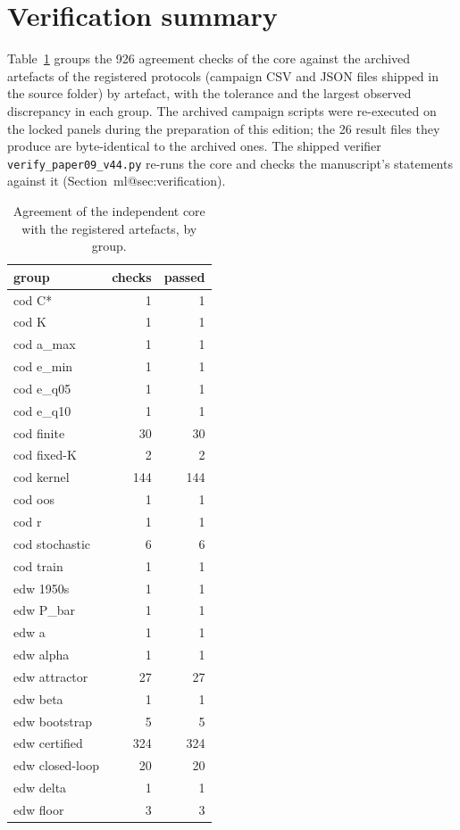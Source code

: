 \documentclass[11pt,a4paper]{article}
\makeatletter
\newcommand{\mref}[1]{\csname ml@#1\endcsname}
\makeatother
\begin{document}
\section{Verification summary}\label{si:checks}
Table~\ref{tab:si-checks} groups the 926 agreement checks of the core against the archived artefacts of the registered protocols (campaign CSV and JSON files shipped in the source folder) by artefact, with the tolerance and the largest observed discrepancy in each group. The archived campaign scripts were re-executed on the locked panels during the preparation of this edition; the 26 result files they produce are byte-identical to the archived ones. The shipped verifier \texttt{verify\_paper09\_v44.py} re-runs the core and checks the manuscript's statements against it (Section~\mref{sec:verification}).
\begin{table}[H]
\centering
\caption{Agreement of the independent core with the registered artefacts, by group.}
\label{tab:si-checks}
\small
\begin{tabular}{lrr}
\toprule
group & checks & passed \\
\midrule
cod C* & 1 & 1 \\
cod K & 1 & 1 \\
cod a\_max & 1 & 1 \\
cod e\_min & 1 & 1 \\
cod e\_q05 & 1 & 1 \\
cod e\_q10 & 1 & 1 \\
cod finite & 30 & 30 \\
cod fixed-K & 2 & 2 \\
cod kernel & 144 & 144 \\
cod oos & 1 & 1 \\
cod r & 1 & 1 \\
cod stochastic & 6 & 6 \\
cod train & 1 & 1 \\
edw 1950s & 1 & 1 \\
edw P\_bar & 1 & 1 \\
edw a & 1 & 1 \\
edw alpha & 1 & 1 \\
edw attractor & 27 & 27 \\
edw beta & 1 & 1 \\
edw bootstrap & 5 & 5 \\
edw certified & 324 & 324 \\
edw closed-loop & 20 & 20 \\
edw delta & 1 & 1 \\
edw floor & 3 & 3 \\

\end{tabular}
\end{table}
\end{document}
